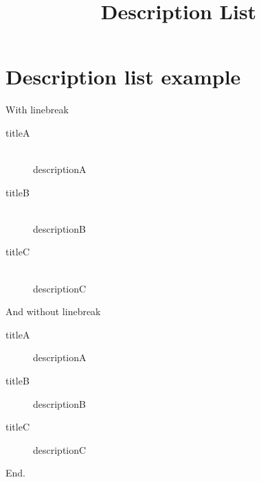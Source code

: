 \documentclass[a4paper,11pt,oneside,openany,report]{jsbook}
\title{Description List}
\begin{document}
\maketitle
\chapter{Description list example}\label{ch:Descriptionlistexample}
With linebreak
\begin{description}
\item[titleA]\mbox{}\\descriptionA
\item[titleB]\mbox{}\\descriptionB
\item[titleC]\mbox{}\\descriptionC
\end{description}And without linebreak
\begin{description}
\item[titleA]descriptionA
\item[titleB]descriptionB
\item[titleC]descriptionC
\end{description}End.
\end{document}
